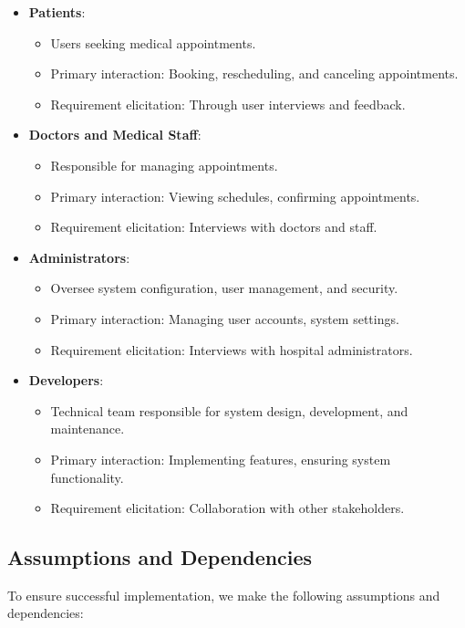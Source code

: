 \documentclass[a4paper, 12pt]{article}
\begin{document}
\begin{itemize}
    \item \textbf{Patients}:
    \begin{itemize}
        \item Users seeking medical appointments.
        \item Primary interaction: Booking, rescheduling, and canceling appointments.
        \item Requirement elicitation: Through user interviews and feedback.
    \end{itemize}
    
    \item \textbf{Doctors and Medical Staff}:
    \begin{itemize}
        \item Responsible for managing appointments.
        \item Primary interaction: Viewing schedules, confirming appointments.
        \item Requirement elicitation: Interviews with doctors and staff.
    \end{itemize}
    
    \item \textbf{Administrators}:
    \begin{itemize}
        \item Oversee system configuration, user management, and security.
        \item Primary interaction: Managing user accounts, system settings.
        \item Requirement elicitation: Interviews with hospital administrators.
    \end{itemize}
    
    \item \textbf{Developers}:
    \begin{itemize}
        \item Technical team responsible for system design, development, and maintenance.
        \item Primary interaction: Implementing features, ensuring system functionality.
        \item Requirement elicitation: Collaboration with other stakeholders.
    \end{itemize}
\end{itemize}

\subsection{Assumptions and Dependencies}
To ensure successful implementation, we make the following assumptions and dependencies:
\end{document}
